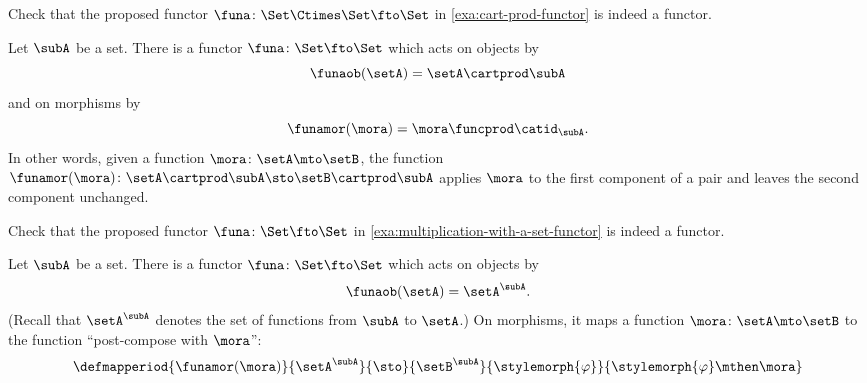 \begin{gradedexercise}
    \label{ex:CartProdAsFunctor}
    Check that the proposed functor $\funa \colon \Set \Ctimes \Set \fto \Set$ in \cref{exa:cart-prod-functor} is indeed a functor.
\end{gradedexercise}

\begin{example}
    \label{exa:multiplication-with-a-set-functor}
    Let $\subA$ be a set.
    There is a functor $\funa \colon \Set \fto \Set$ which acts on objects by
    \begin{equation}
        \funaob(\setA) = \setA \cartprod \subA
    \end{equation}
    and on morphisms by
    \begin{equation}
        \funamor(\mora) = \mora \funcprod \catid_{\subA}.
    \end{equation}
    In other words, given a function $\mora \colon \setA \mto \setB$, the function $\funamor(\mora) \colon \setA \cartprod \subA \sto \setB \cartprod \subA$ applies $\mora$ to the first component of a pair and leaves the second component unchanged.
\end{example}

\begin{gradedexercise}
    \label{ex:MultiplicationWithASet}
    Check that the proposed functor $\funa \colon \Set \fto \Set$ in \cref{exa:multiplication-with-a-set-functor} is indeed a functor.
\end{gradedexercise}

\begin{example}
    \label{exa:exponentiation-with-a-set-functor}
    Let $\subA$ be a set.
    There is a functor $\funa \colon \Set \fto \Set$ which acts on objects by
    \begin{equation}
        \funaob(\setA) = \setA^\subA.
    \end{equation}
    (Recall that $\setA^\subA$ denotes the set of functions from $\subA$ to $\setA$.)
    On morphisms, it maps a function $\mora \colon \setA \mto \setB$ to the function ``post-compose with $\mora$'':
    \begin{equation}
        \defmapperiod{\funamor(\mora)}{\setA^\subA}{\sto}{\setB^\subA}{\stylemorph{\varphi}}{\stylemorph{\varphi} \mthen \mora}
    \end{equation}
\end{example}


